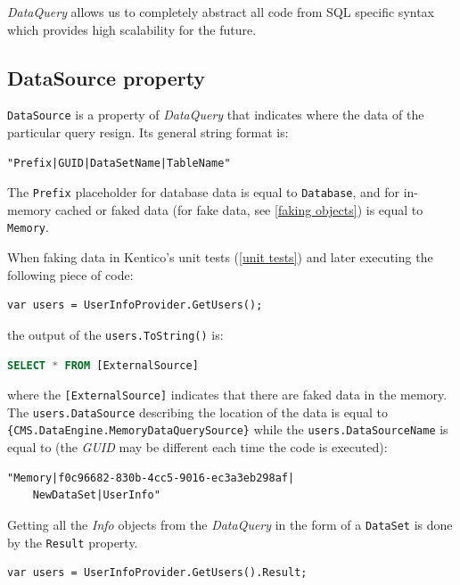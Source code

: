 \documentclass[
  print,
  table,
  nolof,
  nolot,
  nocover,
  oneside
]{fithesis3}
\begin{document}
\textit{DataQuery} allows us to completely abstract all code from SQL specific syntax which provides high scalability for the future\parencite{kentico02}.\newline


\subsection{DataSource property}
\label{DataSource}

\texttt{DataSource} is a property of \textit{DataQuery} that indicates where the data of the particular query resign. Its general string format is:
\begin{lstlisting}
"Prefix|GUID|DataSetName|TableName"
\end{lstlisting}

The \texttt{Prefix} placeholder for database data is equal to \texttt{Database}, and for in-memory cached or faked data (for fake data, see \autoref{faking objects}) is equal to \texttt{Memory}.

When faking data in Kentico's unit tests (\autoref{unit tests}) and later executing the following piece of code:
\begin{lstlisting}
var users = UserInfoProvider.GetUsers();
\end{lstlisting}
the output of the \texttt{users.ToString()} is:
\begin{lstlisting}[language=SQL,escapechar=@,language=SQL,basicstyle=\ttfamily]
SELECT * FROM [ExternalSource]
\end{lstlisting}
where the \texttt{[ExternalSource]} indicates that there are faked data in the memory. The \texttt{users.DataSource} describing the location of the data is equal to \texttt{\{CMS.DataEngine.MemoryDataQuerySource\}} while the \texttt{users.DataSourceName} is equal to (the \textit{GUID} may be different each time the code is executed):
\begin{lstlisting}
"Memory|f0c96682-830b-4cc5-9016-ec3a3eb298af|
    NewDataSet|UserInfo"
\end{lstlisting}

Getting all the \textit{Info} objects from the \textit{DataQuery} in the form of a \texttt{DataSet} is done by the \texttt{Result} property.

\begin{lstlisting}
var users = UserInfoProvider.GetUsers().Result;
\end{lstlisting}
\end{document}
